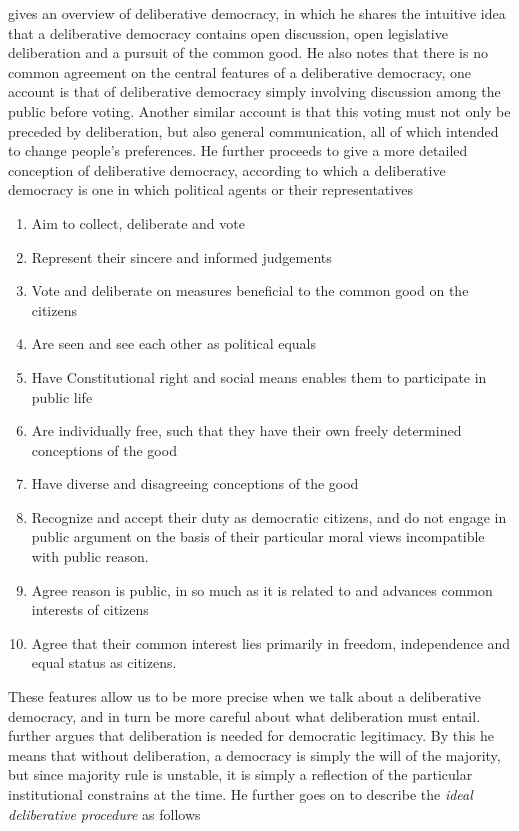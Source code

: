 \citet{freemanDeliberativeDemocracySympathetic2000} gives an overview of deliberative democracy, in which he shares the intuitive idea that a deliberative democracy contains open discussion, open legislative deliberation and a pursuit of the common good. He also notes that there is no common agreement on the central features of a deliberative democracy, one account is that of deliberative democracy simply involving discussion among the public before voting. Another similar account is that this voting must not only be preceded by deliberation, but also general communication, all of which intended to change people's preferences. He further proceeds to give a more detailed conception of deliberative democracy, according to which a deliberative democracy is one in which political agents or their representatives

\begin{enumerate}
	\label{list:deliberative-democracy}
	\setlength\itemsep{1px}
	\item  Aim to collect, deliberate and vote
	\item  Represent their sincere and informed judgements
	\item  Vote and deliberate on measures beneficial to the common good on the citizens
	\item  Are seen and see each other as political equals
	\item  Have Constitutional right and social means enables them to participate in public life
	\item  Are individually free, such that they have their own freely determined conceptions of the good
	\item  Have diverse and disagreeing conceptions of the good
	\item  Recognize and accept their duty as democratic citizens, and do not engage in public argument on the basis of their particular moral views incompatible with public reason.
	\item  Agree reason is public, in so much as it is related to and advances common interests of citizens
	\item  Agree that their common interest lies primarily in freedom, independence and equal status as citizens.
\end{enumerate}

These features allow us to be more precise when we talk about a deliberative democracy, and in turn be more careful about what deliberation must entail. \citet{cohenDeliberationDemocraticLegimitimacy2002} further argues that deliberation is needed for democratic legitimacy. By this he means that without deliberation, a democracy is simply the will of the majority, but since majority rule is unstable, it is simply a reflection of the particular institutional constrains at the time. He further goes on to describe the \textit{ideal deliberative procedure} as follows

